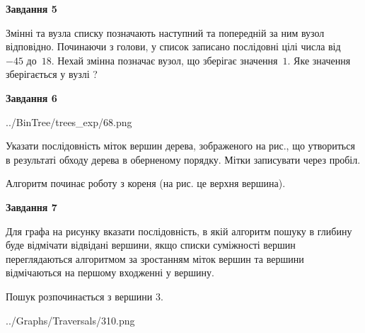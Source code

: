 \documentclass[12pt, ukrainian]{article}
\begin{document}
{\begin {large}
{\begin {center}\textbf{Завдання 5}\end {center}}\par
Змінні  та  вузла списку позначають наступний та попередній за ним вузол відповідно. Починаючи з голови, у список записано послідовні цілі числа від~$-45$ до~$18$. Нехай змінна  позначає вузол, що зберігає значення~$1$.
Яке значення зберігається у вузлі  ?\par
\newpage

{\begin {center}\textbf{Завдання 6}\end {center}}\par

\begin{center}
	{../BinTree/trees_exp/68.png}
\end{center}
Указати послідовність міток вершин дерева, зображеного на рис., що утвориться в результаті обходу дерева в оберненому порядку. Мітки записувати через пробіл.\par Алгоритм починає роботу з кореня (на рис. це верхня вершина).\par
\newpage

{\begin {center}\textbf{Завдання 7}\end {center}}\par
Для графа на рисунку вказати послідовність, в якій алгоритм пошуку в глибину буде відмічати відвідані вершини, якщо списки суміжності вершин переглядаються алгоритмом за зростанням міток вершин та вершини відмічаються на першому вход\-женні у вершину.\par
Пошук розпочинається з вершини 3.\par

\begin{center}
	{../Graphs/Traversals/310.png}
\end{center}\par
\newpage


\end{large}}
\end{document}
